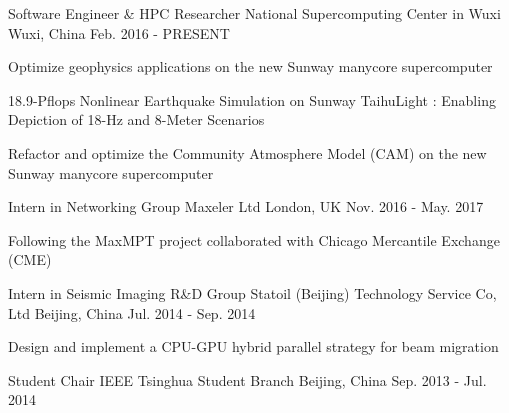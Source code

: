 \documentclass[11pt, a4paper]{awesome-cv}
\begin{document}
\begin{cventries}
    
  \cventry
    {Software Engineer \& HPC Researcher} %
    {National Supercomputing Center in Wuxi} %
    {Wuxi, China} %
    {Feb. 2016 - PRESENT} %
    {
      \begin{cvitems} %
        \item {Optimize geophysics applications on the new Sunway manycore supercomputer}
        \item {18.9-Pflops Nonlinear Earthquake Simulation on Sunway TaihuLight : Enabling Depiction of 18-Hz and 8-Meter Scenarios}
        \item {Refactor and optimize the Community Atmosphere Model (CAM) on the new Sunway manycore supercomputer}
      \end{cvitems}
    }
    
  \cventry
    {Intern in Networking Group} %
    {Maxeler Ltd} %
    {London, UK} %
    {Nov. 2016 - May. 2017} %
    {
      \begin{cvitems} %
        \item {Following the MaxMPT project collaborated with Chicago Mercantile Exchange (CME)}
      \end{cvitems}
    }


  \cventry
    {Intern in Seismic Imaging R\&D Group} %
    {Statoil (Beijing) Technology Service Co, Ltd} %
    {Beijing, China} %
    {Jul. 2014 - Sep. 2014} %
    {
      \begin{cvitems} %
        \item {Design and implement a CPU-GPU hybrid parallel strategy for beam migration}
      \end{cvitems}
    }

  \cventry
    {Student Chair} %
    {IEEE Tsinghua Student Branch} %
    {Beijing, China} %
    {Sep. 2013 - Jul. 2014} %
    {
    }

\end{cventries}
\end{document}
